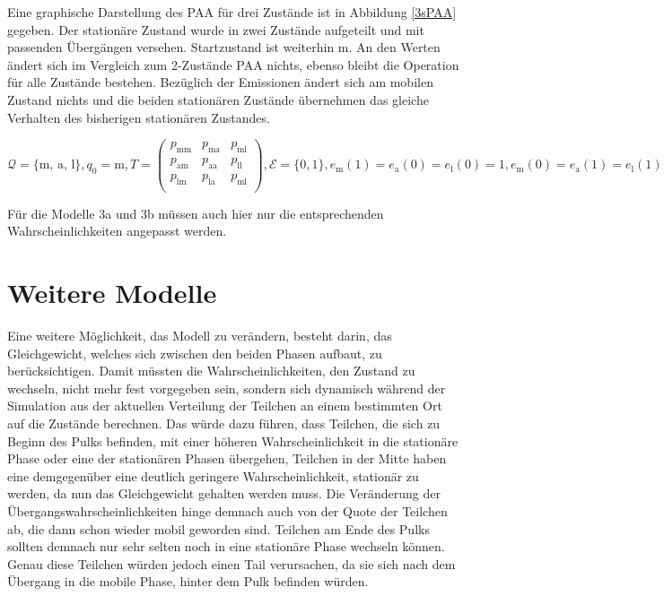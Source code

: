 Eine graphische Darstellung des PAA für drei Zustände ist in Abbildung \ref{3sPAA} gegeben. Der stationäre Zustand wurde in zwei Zustände aufgeteilt und mit passenden Übergängen versehen. Startzustand ist weiterhin m. An den Werten ändert sich im Vergleich zum 2-Zustände PAA nichts, ebenso bleibt die Operation für alle Zustände bestehen. Bezüglich der Emissionen ändert sich am mobilen Zustand nichts und die beiden stationären Zustände übernehmen das gleiche Verhalten des bisherigen stationären Zustandes.


$ \mathcal{Q} = \{\text{m, a, l}\} , q_0 = \text{m}, T =
 \begin{pmatrix}
  p_{\text{mm}} & p_{\text{ma}} & p_{\text{ml}} \\
  p_{\text{am}} & p_{\text{aa}} & p_{\text{ll}} \\
  p_{\text{lm}} & p_{\text{la}} & p_{\text{ml}} \\
 \end{pmatrix}, \mathcal{E} = \{0, 1\}, e_{\text{m}}(1) = e_{\text{a}}(0) = e_{\text{l}}(0) = 1, e_{\text{m}}(0) = e_{\text{a}}(1) = e_{\text{l}}(1) = 0,
 \mathcal{V} = [0, \ldots, l], v_0 = 0, \theta_{\text{m}} = \theta_{\text{a}} = \theta_{\text{l}} = + $

 Für die Modelle 3a und 3b müssen auch hier nur die entsprechenden Wahrscheinlichkeiten angepasst werden.

\section{Weitere Modelle}

Eine weitere Möglichkeit, das Modell zu verändern, besteht darin, das Gleichgewicht, welches sich zwischen den beiden Phasen aufbaut, zu berücksichtigen. Damit müssten die Wahrscheinlichkeiten, den Zustand zu wechseln, nicht mehr fest vorgegeben sein, sondern sich dynamisch während der Simulation aus der aktuellen Verteilung der Teilchen an einem bestimmten Ort auf die Zustände berechnen. Das würde dazu führen, dass Teilchen, die sich zu Beginn des Pulks befinden, mit einer höheren Wahrscheinlichkeit in die stationäre Phase oder eine der stationären Phasen übergehen, Teilchen in der Mitte haben eine demgegenüber eine deutlich geringere Wahrscheinlichkeit, stationär zu werden, da nun das Gleichgewicht gehalten werden muss. Die Veränderung der Übergangswahrscheinlichkeiten hinge demnach auch von der Quote der Teilchen ab, die dann schon wieder mobil geworden sind. Teilchen am Ende des Pulks sollten demnach nur sehr selten noch in eine stationäre Phase wechseln können. Genau diese Teilchen würden jedoch einen Tail verursachen, da sie sich nach dem Übergang in die mobile Phase, hinter dem Pulk befinden würden.

